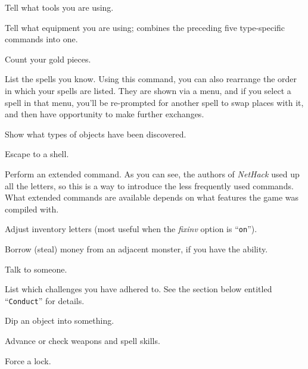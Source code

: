 \item[\tb{(}]
Tell what tools you are using.

\item[\tb{*}]
Tell what equipment you are using; combines the preceding five type-specific
commands into one.

\item[\tb{\$}]
Count your gold pieces.

\item[\tb{+}]
List the spells you know.  Using this command, you can also rearrange
the order in which your spells are listed.  They are shown via a menu,
and if you select a spell in that menu, you'll be re-prompted for
another spell to swap places with it, and then have opportunity to
make further exchanges.

\item[\tb{$\backslash$}]
Show what types of objects have been discovered.

\item[\tb{!}]
Escape to a shell.

\item[\tb{\#}]
Perform an extended command.  As you can see, the authors of {\it NetHack\/}
used up all the letters, so this is a way to introduce the less frequently
used commands.
What extended commands are available depends on what features the game was
compiled with.

\item[\tb{\#{\rm adjust}}]
Adjust inventory letters (most useful when the
{\it fixinv\/} 
option is ``{\tt on}'').

\item[\tb{\#{\rm borrow}}]
Borrow (steal) money from an adjacent monster, if you have the ability.

\item[\tb{\#{\rm chat}}]
Talk to someone.

\item[\tb{\#{\rm conduct}}]
List which challenges you have adhered to.  See the section below entitled
``{\tt Conduct}'' for details.

\item[\tb{\#{\rm dip}}]
Dip an object into something.

\item[\tb{\#{\rm enhance}}]
Advance or check weapons and spell skills.

\item[\tb{\#{\rm force}}]
Force a lock.

